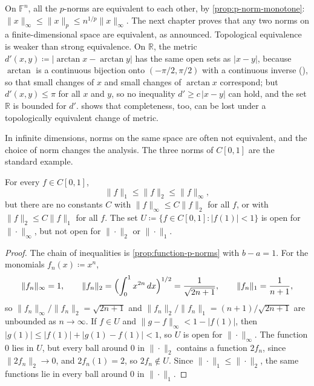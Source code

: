 On $\mathbb F^n$, all the $p$-norms are equivalent to each other, by \cref{prop:p-norm-monotone}: $\|x\|_\infty\le\|x\|_p\le n^{1/p}\|x\|_\infty$. The next chapter proves that any two norms on a finite-dimensional space are equivalent, as  announced. Topological equivalence is weaker than strong equivalence. On $\mathbb R$, the metric $d'(x,y)\coloneqq|\arctan x-\arctan y|$ has the same open sets as $|x-y|$, because $\arctan$ is a continuous bijection onto $(-\pi/2,\pi/2)$ with a continuous inverse (), so that small changes of $x$ and small changes of $\arctan x$ correspond; but $d'(x,y)\le\pi$ for all $x$ and $y$, so no inequality $d'\ge c\,|x-y|$ can hold, and the set $\mathbb R$ is bounded for $d'$.  shows that completeness, too, can be lost under a topologically equivalent change of metric.

In infinite dimensions, norms on the same space are often not equivalent, and the choice of norm changes the analysis. The three norms of $C[0,1]$ are the standard example.

\begin{proposition}
\label{prop:c-norms-inequivalent}
For every $f\in C[0,1]$,
\[
\|f\|_1\le\|f\|_2\le\|f\|_\infty ,
\]
but there are no constants $C$ with $\|f\|_\infty\le C\|f\|_2$ for all $f$, or with $\|f\|_2\le C\|f\|_1$ for all $f$. The set $U\coloneqq\{f\in C[0,1]: |f(1)|<1\}$ is open for $\|\cdot\|_\infty$, but not open for $\|\cdot\|_2$ or $\|\cdot\|_1$.
\end{proposition}

\begin{proof}
The chain of inequalities is \cref{prop:function-p-norms} with $b-a=1$. For the monomials $f_n(x)\coloneqq x^n$,
\[
\|f_n\|_\infty=1,\qquad\|f_n\|_2=\Bigl(\int_0^1x^{2n}\,dx\Bigr)^{1/2}=\frac1{\sqrt{2n+1}},\qquad\|f_n\|_1=\frac1{n+1},
\]
so $\|f_n\|_\infty/\|f_n\|_2=\sqrt{2n+1}$ and $\|f_n\|_2/\|f_n\|_1=(n+1)/\sqrt{2n+1}$ are unbounded as $n\to\infty$. If $f\in U$ and $\|g-f\|_\infty<1-|f(1)|$, then $|g(1)|\le|f(1)|+|g(1)-f(1)|<1$, so $U$ is open for $\|\cdot\|_\infty$. The function $0$ lies in $U$, but every ball around $0$ in $\|\cdot\|_2$ contains a function $2f_n$, since $\|2f_n\|_2\to0$, and $2f_n(1)=2$, so $2f_n\notin U$. Since $\|\cdot\|_1\le\|\cdot\|_2$, the same functions lie in every ball around $0$ in $\|\cdot\|_1$.
\end{proof}

